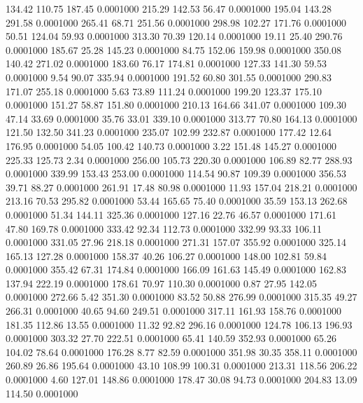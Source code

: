  134.42  110.75  187.45   0.0001000
 215.29  142.53   56.47   0.0001000
 195.04  143.28  291.58   0.0001000
 265.41   68.71  251.56   0.0001000
 298.98  102.27  171.76   0.0001000
  50.51  124.04   59.93   0.0001000
 313.30   70.39  120.14   0.0001000
  19.11   25.40  290.76   0.0001000
 185.67   25.28  145.23   0.0001000
  84.75  152.06  159.98   0.0001000
 350.08  140.42  271.02   0.0001000
 183.60   76.17  174.81   0.0001000
 127.33  141.30   59.53   0.0001000
   9.54   90.07  335.94   0.0001000
 191.52   60.80  301.55   0.0001000
 290.83  171.07  255.18   0.0001000
   5.63   73.89  111.24   0.0001000
 199.20  123.37  175.10   0.0001000
 151.27   58.87  151.80   0.0001000
 210.13  164.66  341.07   0.0001000
 109.30   47.14   33.69   0.0001000
  35.76   33.01  339.10   0.0001000
 313.77   70.80  164.13   0.0001000
 121.50  132.50  341.23   0.0001000
 235.07  102.99  232.87   0.0001000
 177.42   12.64  176.95   0.0001000
  54.05  100.42  140.73   0.0001000
   3.22  151.48  145.27   0.0001000
 225.33  125.73    2.34   0.0001000
 256.00  105.73  220.30   0.0001000
 106.89   82.77  288.93   0.0001000
 339.99  153.43  253.00   0.0001000
 114.54   90.87  109.39   0.0001000
 356.53   39.71   88.27   0.0001000
 261.91   17.48   80.98   0.0001000
  11.93  157.04  218.21   0.0001000
 213.16   70.53  295.82   0.0001000
  53.44  165.65   75.40   0.0001000
  35.59  153.13  262.68   0.0001000
  51.34  144.11  325.36   0.0001000
 127.16   22.76   46.57   0.0001000
 171.61   47.80  169.78   0.0001000
 333.42   92.34  112.73   0.0001000
 332.99   93.33  106.11   0.0001000
 331.05   27.96  218.18   0.0001000
 271.31  157.07  355.92   0.0001000
 325.14  165.13  127.28   0.0001000
 158.37   40.26  106.27   0.0001000
 148.00  102.81   59.84   0.0001000
 355.42   67.31  174.84   0.0001000
 166.09  161.63  145.49   0.0001000
 162.83  137.94  222.19   0.0001000
 178.61   70.97  110.30   0.0001000
   0.87   27.95  142.05   0.0001000
 272.66    5.42  351.30   0.0001000
  83.52   50.88  276.99   0.0001000
 315.35   49.27  266.31   0.0001000
  40.65   94.60  249.51   0.0001000
 317.11  161.93  158.76   0.0001000
 181.35  112.86   13.55   0.0001000
  11.32   92.82  296.16   0.0001000
 124.78  106.13  196.93   0.0001000
 303.32   27.70  222.51   0.0001000
  65.41  140.59  352.93   0.0001000
  65.26  104.02   78.64   0.0001000
 176.28    8.77   82.59   0.0001000
 351.98   30.35  358.11   0.0001000
 260.89   26.86  195.64   0.0001000
  43.10  108.99  100.31   0.0001000
 213.31  118.56  206.22   0.0001000
   4.60  127.01  148.86   0.0001000
 178.47   30.08   94.73   0.0001000
 204.83   13.09  114.50   0.0001000
